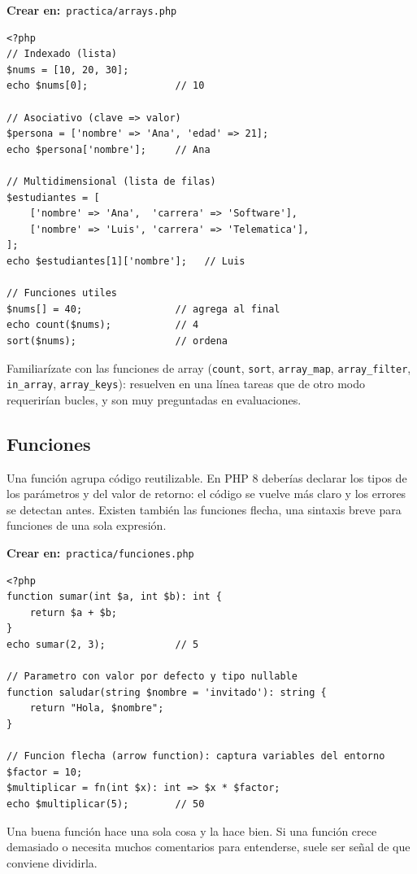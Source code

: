 \documentclass[11pt]{article}
\begin{document}
{\small\color{phpazulo}\textbf{Crear en:}~}\texttt{practica/\allowbreak{}arrays.\allowbreak{}php}\par\nobreak\vspace{-1pt}
\begin{cajacodigo}[Arrays]
\begin{lstlisting}[style=php]
<?php
// Indexado (lista)
$nums = [10, 20, 30];
echo $nums[0];               // 10

// Asociativo (clave => valor)
$persona = ['nombre' => 'Ana', 'edad' => 21];
echo $persona['nombre'];     // Ana

// Multidimensional (lista de filas)
$estudiantes = [
    ['nombre' => 'Ana',  'carrera' => 'Software'],
    ['nombre' => 'Luis', 'carrera' => 'Telematica'],
];
echo $estudiantes[1]['nombre'];   // Luis

// Funciones utiles
$nums[] = 40;                // agrega al final
echo count($nums);           // 4
sort($nums);                 // ordena
\end{lstlisting}
\end{cajacodigo}
\vspace{2pt}
Familiarízate con las funciones de array (\texttt{count}, \texttt{sort}, \texttt{array\_map}, \texttt{array\_filter}, \texttt{in\_array}, \texttt{array\_keys}): resuelven en una línea tareas que de otro modo requerirían bucles, y son muy preguntadas en evaluaciones.

\subsection{Funciones}
Una función agrupa código reutilizable. En PHP 8 deberías declarar los tipos de los parámetros y del valor de retorno: el código se vuelve más claro y los errores se detectan antes. Existen también las funciones flecha, una sintaxis breve para funciones de una sola expresión.

{\small\color{phpazulo}\textbf{Crear en:}~}\texttt{practica/\allowbreak{}funciones.\allowbreak{}php}\par\nobreak\vspace{-1pt}
\begin{cajacodigo}
\begin{lstlisting}[style=php]
<?php
function sumar(int $a, int $b): int {
    return $a + $b;
}
echo sumar(2, 3);            // 5

// Parametro con valor por defecto y tipo nullable
function saludar(string $nombre = 'invitado'): string {
    return "Hola, $nombre";
}

// Funcion flecha (arrow function): captura variables del entorno
$factor = 10;
$multiplicar = fn(int $x): int => $x * $factor;
echo $multiplicar(5);        // 50
\end{lstlisting}
\end{cajacodigo}
\vspace{2pt}
Una buena función hace una sola cosa y la hace bien. Si una función crece demasiado o necesita muchos comentarios para entenderse, suele ser señal de que conviene dividirla.
\end{document}
